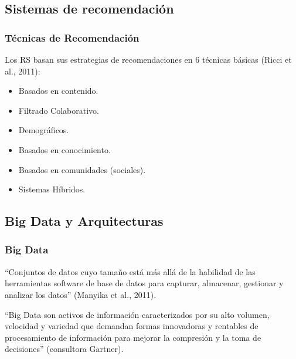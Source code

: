 \subsection{Sistemas de recomendación}
\begin{frame}
	\frametitle{Técnicas de Recomendación}
	Los RS basan sus estrategias de recomendaciones en 6 técnicas básicas (Ricci et al., 2011):
	\bigskip
	\begin{itemize} [<+>]
		\item Basados en contenido.
		\item Filtrado Colaborativo.
		\item Demográficos.
		\item Basados en conocimiento.
		\item Basados en comunidades (sociales).
		\item Sistemas Híbridos.
	\end{itemize}
\end{frame}

\subsection{Big Data y Arquitecturas}
\begin{frame}[allowframebreaks]
	\frametitle{Big Data}
	\begin{tcolorbox}[colback=blue!5,colframe=blue!40!black,title=Big Data]
		``Conjuntos de datos cuyo tamaño está más allá de la habilidad de las herramientas software de base de datos para capturar, almacenar, gestionar y analizar los datos'' (Manyika et al., 2011).

		\bigskip

		``Big Data son activos de información caracterizados por su alto volumen, velocidad y variedad que demandan formas innovadoras y rentables de procesamiento de información para mejorar la compresión y la toma de decisiones'' (consultora Gartner).
	\end{tcolorbox}
\end{frame}


